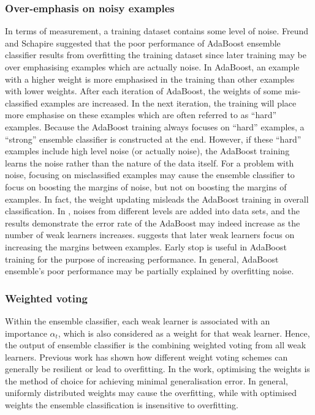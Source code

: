 \subsubsection{Over-emphasis on noisy examples}
In terms of measurement, a training dataset contains some level of noise. Freund and Schapire \cite{Freund1996} suggested that the poor performance of AdaBoost ensemble classifier results from overfitting the training dataset since later training may be over emphasising examples which are actually noise. In AdaBoost, an example with a higher weight is more emphasised in the training than other examples with lower weights. After each iteration of AdaBoost, the weights of some mis-classified examples are increased. In the next iteration, the training will place more emphasise on these examples which are often referred to as ``hard'' examples. Because the AdaBoost training always focuses on ``hard'' examples, a ``strong'' ensemble classifier is constructed at the end. However, if these ``hard'' examples include high level noise (or actually noise), the AdaBoost training learns the noise rather than the nature of the data itself. For a problem with noise, focusing on misclassified examples may cause the ensemble classifier to focus on boosting the margins of noise, but not on boosting the margins of examples. In fact, the weight updating misleads the AdaBoost training in overall classification. In \cite{Opitz1999}, noises from different levels are added into data sets, and the results demonstrate the error rate of the AdaBoost may indeed increase as the number of weak learners increases. \cite{Schapire1997} suggests that later weak learners focus on increasing the margins between examples. Early stop is useful in AdaBoost training for the purpose of increasing performance. In general, AdaBoost ensemble's poor performance may be partially explained by overfitting noise.

\subsubsection{Weighted voting}
Within the ensemble classifier, each weak learner is associated with an importance $\alpha_t$, which is also considered as a weight for that weak learner. Hence, the output of ensemble classifier is the combining weighted voting from all weak learners. Previous work \cite{Sollich1995} has shown how different weight voting schemes can generally be resilient or lead to overfitting. In the work, optimising the weights is the method of choice for achieving minimal generalisation error. In general, uniformly distributed weights may cause the overfitting, while with optimised weights the ensemble classification is insensitive to overfitting.

